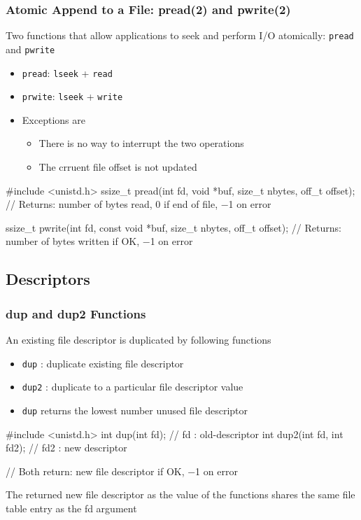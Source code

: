 \documentclass[newPxFont,sthlmFooter,nooffset]{beamer}
\begin{document}
\begin{frame}[containsverbatim,t]
  \frametitle{Atomic Append to a  File: pread(2) and pwrite(2)}

Two functions that allow applications to seek and perform I/O atomically: \texttt{pread} and \texttt{pwrite}
\begin{itemize}
\item \texttt{pread}: \texttt{lseek} + \texttt{read}
\item \texttt{prwite}: \texttt{lseek} + \texttt{write}
\item Exceptions are
  \begin{itemize}
  \item There is no way to interrupt the two operations
  \item The crruent file offset is not updated
  \end{itemize}
\end{itemize}

\begin{codedef}
#include <unistd.h>
ssize_t pread(int fd, void *buf, size_t nbytes, off_t offset);
// Returns: number of bytes read, 0 if end of file, −1 on error

ssize_t pwrite(int fd, const void *buf, size_t nbytes, off_t offset); 
// Returns: number of bytes written if OK, −1 on error
\end{codedef}
\end{frame}


\subsection{Descriptors}
\begin{frame}[containsverbatim,t]
  \frametitle{dup and dup2 Functions}

An existing file descriptor is duplicated by following functions
\begin{itemize}
\item \texttt{dup} : duplicate existing file descriptor
\item \texttt{dup2} : duplicate to a particular file descriptor value
\item \texttt{dup} returns the lowest number unused file descriptor
\end{itemize}
\begin{codedef}
#include <unistd.h>
int dup(int fd); // fd : old-descriptor
int dup2(int fd, int fd2); // fd2 : new descriptor

// Both return: new file descriptor if OK, −1 on error    
\end{codedef}

\bigskip
The returned new file descriptor as the value of the functions shares the same file table entry as the fd argument

\end{frame}
\end{document}

